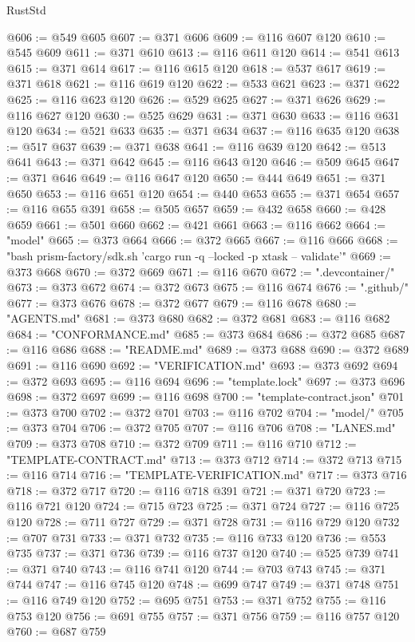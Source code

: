 \begin{lexlean}{RustStd}
\begin{coremodule}
@606 := @549 @605
@607 := @371 @606
@609 := @116 @607 @120
@610 := @545 @609
@611 := @371 @610
@613 := @116 @611 @120
@614 := @541 @613
@615 := @371 @614
@617 := @116 @615 @120
@618 := @537 @617
@619 := @371 @618
@621 := @116 @619 @120
@622 := @533 @621
@623 := @371 @622
@625 := @116 @623 @120
@626 := @529 @625
@627 := @371 @626
@629 := @116 @627 @120
@630 := @525 @629
@631 := @371 @630
@633 := @116 @631 @120
@634 := @521 @633
@635 := @371 @634
@637 := @116 @635 @120
@638 := @517 @637
@639 := @371 @638
@641 := @116 @639 @120
@642 := @513 @641
@643 := @371 @642
@645 := @116 @643 @120
@646 := @509 @645
@647 := @371 @646
@649 := @116 @647 @120
@650 := @444 @649
@651 := @371 @650
@653 := @116 @651 @120
@654 := @440 @653
@655 := @371 @654
@657 := @116 @655 @391
@658 := @505 @657
@659 := @432 @658
@660 := @428 @659
@661 := @501 @660
@662 := @421 @661
@663 := @116 @662
@664 := "model"
@665 := @373 @664
@666 := @372 @665
@667 := @116 @666
@668 := "bash prism-factory/sdk.sh 'cargo run -q --locked -p xtask -- validate'"
@669 := @373 @668
@670 := @372 @669
@671 := @116 @670
@672 := ".devcontainer/"
@673 := @373 @672
@674 := @372 @673
@675 := @116 @674
@676 := ".github/"
@677 := @373 @676
@678 := @372 @677
@679 := @116 @678
@680 := "AGENTS.md"
@681 := @373 @680
@682 := @372 @681
@683 := @116 @682
@684 := "CONFORMANCE.md"
@685 := @373 @684
@686 := @372 @685
@687 := @116 @686
@688 := "README.md"
@689 := @373 @688
@690 := @372 @689
@691 := @116 @690
@692 := "VERIFICATION.md"
@693 := @373 @692
@694 := @372 @693
@695 := @116 @694
@696 := "template.lock"
@697 := @373 @696
@698 := @372 @697
@699 := @116 @698
@700 := "template-contract.json"
@701 := @373 @700
@702 := @372 @701
@703 := @116 @702
@704 := "model/"
@705 := @373 @704
@706 := @372 @705
@707 := @116 @706
@708 := "LANES.md"
@709 := @373 @708
@710 := @372 @709
@711 := @116 @710
@712 := "TEMPLATE-CONTRACT.md"
@713 := @373 @712
@714 := @372 @713
@715 := @116 @714
@716 := "TEMPLATE-VERIFICATION.md"
@717 := @373 @716
@718 := @372 @717
@720 := @116 @718 @391
@721 := @371 @720
@723 := @116 @721 @120
@724 := @715 @723
@725 := @371 @724
@727 := @116 @725 @120
@728 := @711 @727
@729 := @371 @728
@731 := @116 @729 @120
@732 := @707 @731
@733 := @371 @732
@735 := @116 @733 @120
@736 := @553 @735
@737 := @371 @736
@739 := @116 @737 @120
@740 := @525 @739
@741 := @371 @740
@743 := @116 @741 @120
@744 := @703 @743
@745 := @371 @744
@747 := @116 @745 @120
@748 := @699 @747
@749 := @371 @748
@751 := @116 @749 @120
@752 := @695 @751
@753 := @371 @752
@755 := @116 @753 @120
@756 := @691 @755
@757 := @371 @756
@759 := @116 @757 @120
@760 := @687 @759

\end{coremodule}
\end{lexlean}
